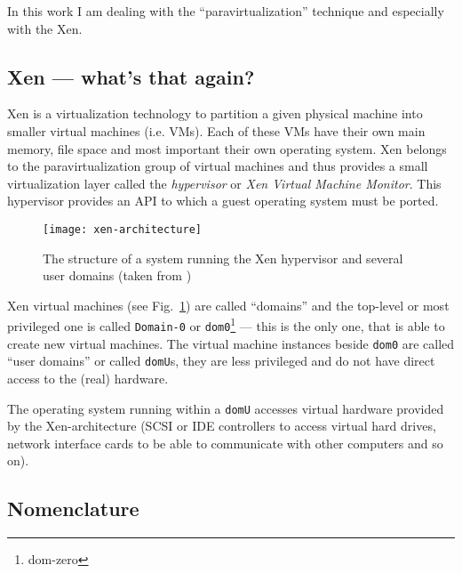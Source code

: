 In this  work I am  dealing with the ``paravirtualization''  technique and
especially with the Xen.

\subsection{Xen --- what's that again?}

Xen  \cite{xen}  is  a  virtualization  technology to  partition  a  given
physical machine into smaller virtual  machines (i.e. VMs).  Each of these
VMs have  their own main memory,  file space and most  important their own
operating system.  Xen belongs  to the paravirtualization group of virtual
machines  and  thus  provides  a  small virtualization  layer  called  the
\emph{hypervisor} or  \emph{Xen Virtual Machine  Monitor}. This hypervisor
provides an API to which a guest operating system must be ported.


\begin{figure}[htbp]
  \begin{center}
    \texttt{[image: xen-architecture]}
  \end{center}
  \caption[Xen architecture]{The structure of a system running the Xen
    hypervisor and several user domains (taken from \cite{xen-art})}
  \label{fig:xen-architecture}
\end{figure}

Xen  virtual  machines  (see Fig.~\ref{fig:xen-architecture})  are  called
``domains''  and   the  top-level  or   most  privileged  one   is  called
\texttt{Domain-0} or \texttt{dom0}\footnote{dom-zero} --- this is the only
one, that  is able  to create new  virtual machines.  The  virtual machine
instances  beside  \texttt{dom0} are  called  ``user  domains'' or  called
\texttt{domU}s, they are less privileged  and do not have direct access to
the (real) hardware.

The  operating  system running  within  a  \texttt{domU} accesses  virtual
hardware  provided by  the Xen-architecture  (SCSI or  IDE  controllers to
access  virtual  hard  drives,  network  interface cards  to  be  able  to
communicate with other computers and so on).

\subsection{Nomenclature}

